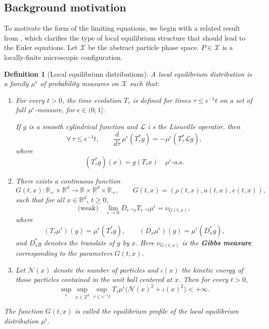 \documentclass[11pt]{article}
\newtheorem{definition}{Definition}
\begin{document}
\subsection{Background motivation} \label{subsec:motivation}
To motivate the form of the limiting equations, we begin with a related result from \cite[Section 0]{DeMasiEtAl1984}, which clarifies the type of local equilibrium structure that should lead to the Euler equations. Let $\mathcal{X}$ be the abstract particle phase space. $P\in\mathcal{X}$ is a locally-finite microscopic configuration.

\begin{definition}[Local equilibrium distributions]\label{def:localequi}
A \emph{local equilibrium distribution} is a family $\mu^\epsilon$ of probability
measures on $\mathcal X$ such that:

\begin{enumerate}
\item[(i)] For every $t > 0$, the time evolution $T_\tau$ is defined for times
$\tau \le \epsilon^{-1}t$ on a set of full $\mu^\epsilon$-measure,
for $\epsilon \in (0,1]$. 

If $g$ is a smooth cylindrical function and $\mathcal L$ i
s the Liouville operator, then
\[\label{1.10}\tag{1.10}
\forall\, \tau \le \epsilon^{-1}t,
\qquad
\frac{d}{d\tau}\,\mu^\epsilon(T_\tau^* g)
=
-\mu^\epsilon(T_\tau^* \mathcal L g),
\]
where
\[
(T_\tau^* g)(x) = g(T_\tau x)
\quad \mu^\epsilon\text{-a.s.}
\]

\item[(ii)] There exists a continuous function
\[
G(t,x) : \mathbb R_+ \times \mathbb R^d 
\longrightarrow 
\mathbb R \times \mathbb R^d \times \mathbb R_+,
\qquad
G(t,x) = (\rho(t,x), u(t,x), e(t,x)),
\]
such that for all $x \in \mathbb R^d$, $t \ge 0$,
\[
\text{(weak)} \quad
\lim_{\epsilon \to 0}
D_{\epsilon^{-1}x} T_{\epsilon^{-1}t} \mu^\epsilon
=
\nu_{G(t,x)},\label{1.11}\tag{1.11}
\]
where
\[
(T_\tau \mu^\epsilon)(g) = \mu^\epsilon(T_\tau^* g),
\qquad
(D_x \mu^\epsilon)(g) = \mu^\epsilon(D_x^* g),
\]
and $D_x^* g$ denotes the translate of $g$ by $x$.
Here $\nu_{G(t,x)}$ is the \textbf{Gibbs measure} corresponding to the
parameters $G(t,x)$.

\item[(iii)] Let $\mathcal N(x)$ denote the number of particles and
$\iota(x)$ the kinetic energy of those particles contained in the
unit ball centered at $x$. Then for every $t > 0$,
\[
\sup_{\epsilon}
\sup_{x \in \mathbb Z^d}
\sup_{\tau \le \epsilon^{-1}t}
T_\tau \mu^\epsilon\big( \mathcal N(x)^2 + \iota(x)^2 \big)
< +\infty.\label{1.12}\tag{1.12}
\]
\end{enumerate}

The function $G(t,x)$ is called the \emph{equilibrium profile}
of the local equilibrium distribution $\mu^\epsilon$.
\end{definition}
\end{document}
